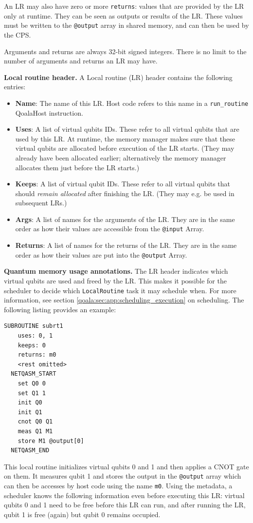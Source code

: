 An LR may also have zero or more \texttt{returns}: values that are provided by the LR only at runtime.
They can be seen as outputs or results of the LR.
These values must be written to the \texttt{@output} array in shared memory, and can then be used by the CPS.

Arguments and returns are always 32-bit signed integers. There is no limit to the number of arguments and returns an LR may have.

\textbf{Local routine header.}
A Local routine (LR) header contains the following entries:
\begin{itemize}
\item \textbf{Name}: The name of this LR. Host code refers to this name in a \texttt{run\_routine} QoalaHost instruction.
\item \textbf{Uses}: A list of virtual qubits IDs. These refer to all virtual qubits that are used by this LR. At runtime, the memory manager makes sure that these virtual qubits are allocated before execution of the LR starts. (They may already have been allocated earlier; alternatively the memory manager allocates them just before the LR starts.)
\item \textbf{Keeps}: A list of virtual qubit IDs. These refer to all virtual qubits that should \textit{remain allocated} after finishing the LR. (They may e.g. be used in subsequent LRs.)
\item \textbf{Args}: A list of names for the arguments of the LR. They are in the same order as how their values are accessible from the \texttt{@input} Array.
\item \textbf{Returns}: A list of names for the returns of the LR. They are in the same order as how their values are put into the \texttt{@output} Array.
\end{itemize}

\textbf{Quantum memory usage annotations.}
The LR header indicates which virtual qubits are used and freed by the LR. This makes it possible for the scheduler to decide which \texttt{LocalRoutine} task it may schedule when. For more information, see section \cref{qoala:sec:app:scheduling_execution} on scheduling.
The following listing provides an example:

\begin{lstlisting}
SUBROUTINE subrt1
    uses: 0, 1
    keeps: 0
    returns: m0
    <rest omitted>
  NETQASM_START
    set Q0 0
    set Q1 1
    init Q0
    init Q1
    cnot Q0 Q1
    meas Q1 M1
    store M1 @output[0]
  NETQASM_END
\end{lstlisting}
This local routine initializes virtual qubits 0 and 1 and then applies a CNOT gate on them.
It measures qubit 1 and stores the output in the \texttt{@output} array which can then be accesses by host code using the name \texttt{m0}.
Using the metadata, a scheduler knows the following information even before executing this LR: virtual qubits 0 and 1 need to be free before this LR can run, and after running the LR, qubit 1 is free (again) but qubit 0 remains occupied.

